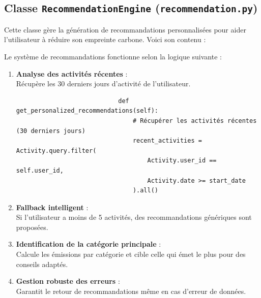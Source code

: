 \documentclass[a4paper,11pt]{article}
\begin{document}
        \subsection{Classe \texttt{RecommendationEngine} (\texttt{recommendation.py})}
            \noindent Cette classe gère la génération de recommandations personnalisées pour aider l'utilisateur à réduire son empreinte carbone. Voici son contenu :

            

            \noindent Le système de recommandations fonctionne selon la logique suivante :

            \begin{enumerate}
                \item \textbf{Analyse des activités récentes} :\\
                    Récupère les 30 derniers jours d'activité de l'utilisateur.

                    \begin{tcolorbox}[colback=lightgray!6, colframe=black, left=-35mm, right=5mm, top=2mm, bottom=0mm, boxrule=0.1mm]
                        \begin{verbatim}
                            def get_personalized_recommendations(self):
                                # Récupérer les activités récentes (30 derniers jours)
                                recent_activities = Activity.query.filter(
                                    Activity.user_id == self.user_id,
                                    Activity.date >= start_date
                                ).all()
                        \end{verbatim}
                    \end{tcolorbox}

                \item \textbf{Fallback intelligent} :\\
                    Si l'utilisateur a moins de 5 activités, des recommandations génériques sont proposées.

                \item \textbf{Identification de la catégorie principale} :\\
                    Calcule les émissions par catégorie et cible celle qui émet le plus pour des conseils adaptés.

                \item \textbf{Gestion robuste des erreurs} :\\
                    Garantit le retour de recommandations même en cas d'erreur de données.


\end{enumerate}
\end{document}
